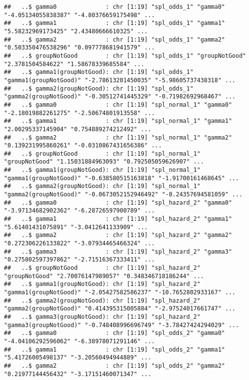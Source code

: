 \documentclass[
]{article}
\begin{document}
\begin{verbatim}
##   ..$ gamma0              : chr [1:19] "spl_odds_1" "gamma0" "-4.05134055838387" "-4.80376659175498" ...
##   ..$ gamma1              : chr [1:19] "spl_odds_1" "gamma1" "5.58232969173425" "2.43480666610325" ...
##   ..$ gamma2              : chr [1:19] "spl_odds_1" "gamma2" "0.503350476538296" "0.097778681941579" ...
##   ..$ groupNotGood        : chr [1:19] "spl_odds_1" "groupNotGood" "2.3781504584622" "1.58678339685584" ...
##   ..$ gamma1(groupNotGood): chr [1:19] "spl_odds_1" "gamma1(groupNotGood)" "-2.78613201450035" "-5.98605737438318" ...
##   ..$ gamma2(groupNotGood): chr [1:19] "spl_odds_1" "gamma2(groupNotGood)" "-0.30512741445329" "-0.71982692968467" ...
##   ..$ gamma0              : chr [1:19] "spl_normal_1" "gamma0" "-2.18019882261275" "-2.50674801913558" ...
##   ..$ gamma1              : chr [1:19] "spl_normal_1" "gamma1" "2.00295337145904" "0.754889274212492" ...
##   ..$ gamma2              : chr [1:19] "spl_normal_1" "gamma2" "0.139231995860261" "-0.0310867431656386" ...
##   ..$ groupNotGood        : chr [1:19] "spl_normal_1" "groupNotGood" "1.15031884963093" "0.792505059626907" ...
##   ..$ gamma1(groupNotGood): chr [1:19] "spl_normal_1" "gamma1(groupNotGood)" "-0.638580515163818" "-1.91700161468645" ...
##   ..$ gamma2(groupNotGood): chr [1:19] "spl_normal_1" "gamma2(groupNotGood)" "-0.0673052152946492" "-0.24357694581059" ...
##   ..$ gamma0              : chr [1:19] "spl_hazard_2" "gamma0" "-3.97134682902362" "-6.28726597900789" ...
##   ..$ gamma1              : chr [1:19] "spl_hazard_2" "gamma1" "5.61401431075891" "-3.0412641133909" ...
##   ..$ gamma2              : chr [1:19] "spl_hazard_2" "gamma2" "0.272306226133822" "-3.07934465466324" ...
##   ..$ gamma3              : chr [1:19] "spl_hazard_2" "gamma3" "0.275802597397862" "-2.71516367333411" ...
##   ..$ groupNotGood        : chr [1:19] "spl_hazard_2" "groupNotGood" "2.70076147989057" "0.348346718186244" ...
##   ..$ gamma1(groupNotGood): chr [1:19] "spl_hazard_2" "gamma1(groupNotGood)" "-2.05427582586237" "-10.7652802933167" ...
##   ..$ gamma2(groupNotGood): chr [1:19] "spl_hazard_2" "gamma2(groupNotGood)" "0.414395315005884" "-2.97524017661747" ...
##   ..$ gamma3(groupNotGood): chr [1:19] "spl_hazard_2" "gamma3(groupNotGood)" "-0.748408996696749" "-3.78427424294029" ...
##   ..$ gamma0              : chr [1:19] "spl_odds_2" "gamma0" "-4.04106292596062" "-6.38978071291146" ...
##   ..$ gamma1              : chr [1:19] "spl_odds_2" "gamma1" "5.41726005498137" "-3.20560494944889" ...
##   ..$ gamma2              : chr [1:19] "spl_odds_2" "gamma2" "0.21977144456432" "-3.17151460071347" ...

\end{verbatim}
\end{document}
